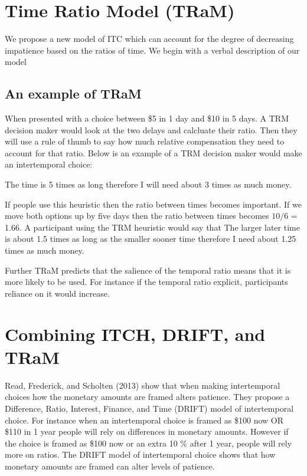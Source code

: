 \documentclass[]{article}
\begin{document}
\section{Time Ratio Model (TRaM)}

We propose a new model of ITC which can account for the degree of decreasing impatience based on the ratios of time. 
We begin with a verbal description of our model

\subsection{An example of TRaM}

When presented with a choice between \$5 in 1 day and \$10 in 5 days. 
A TRM decision maker would look at the two delays and calcluate their ratio. 
Then they will use a rule of thumb to say how much relative compensation they need to account for that ratio.
Below is an example of a TRM decision maker would make an intertemporal choice:

The time is 5 times as long therefore I will need about 3 times as much money. 

If people use this heuristic then the ratio between times becomes important. 
If we move both options up by five days then the ratio between times becomes $10/6$ = 1.66. A participant using the TRM heuristic would say that 
The larger later time is about 1.5 times as long as the smaller sooner time therefore I need about 1.25 times as much money. 

Further TRaM predicts that the salience of the temporal ratio means that it is more likely to be used. 
For instance if the temporal ratio explicit, participants reliance on it would increase.



\section{Combining ITCH, DRIFT, and TRaM }

Read, Frederick, and Scholten (2013) show that when making intertemporal choices how the monetary amounts are framed alters patience. 
They propose a Difference, Ratio, Interest, Finance, and Time (DRIFT) model of intertemporal choice. 
For instance when an intertemporal choice is framed as \$100 now OR \$110 in 1 year people will rely on differences in monetary amounts.
However if the choice is framed as \$100 now or an extra 10 \% after 1 year, people will rely more on ratios. 
The DRIFT model of intertemporal choice shows that how monetary amounts are framed can alter levels of patience.
\end{document}
